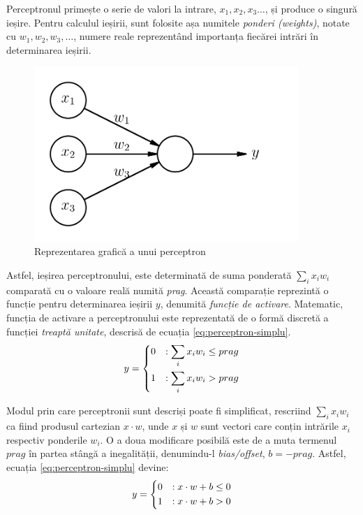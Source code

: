 Perceptronul primește o serie de valori la intrare, $x_1, x_2, x_3\dots$, și produce o singură ieșire. Pentru calculul ieșirii, sunt folosite așa numitele \textit{ponderi (weights)}, notate cu $w_1, w_2, w_3,\dots$, numere reale reprezentând importanța fiecărei intrări în determinarea ieșirii.
\begin{figure}[ht]
\centering
\includegraphics[width=10cm, keepaspectratio]{fig/cap2/perceptron.png}
\caption{Reprezentarea grafică a unui perceptron}
\end{figure}

Astfel, ieșirea perceptronului, este determinată de suma ponderată $\sum_i x_iw_i$ comparată cu o valoare reală numită \textit{prag}. Această comparație reprezintă o funcție pentru determinarea ieșirii $y$, denumită \textit{funcție de activare}. Matematic, funcția de activare a perceptronului este reprezentată de o formă discretă a funcției \textit{treaptă unitate}, descrisă de ecuația \eqref{eq:perceptron-simplu}.
\begin{equation}
y = 
	\begin{dcases}
	0 & : \sum_i x_iw_i \le prag\\
	1 & : \sum_i x_iw_i > prag
	\end{dcases}
\label{eq:perceptron-simplu}
\end{equation}

Modul prin care perceptronii sunt descriși poate fi simplificat, rescriind $\sum\nolimits_i x_iw_i$ ca fiind produsul cartezian $x \cdot w$, unde $x$ și $w$ sunt vectori care conțin intrările $x_i$ respectiv ponderile $w_i$. O a doua modificare posibilă este de a muta termenul $prag$ în partea stângă a inegalității, denumindu-l \textit{bias/offset}, $b=-prag$. Astfel, ecuația \eqref{eq:perceptron-simplu} devine:
\begin{equation}
y = 
	\begin{dcases}
	0 & : x \cdot w + b \le 0\\
	1 & : x \cdot w + b > 0
	\end{dcases}
\label{eq:perceptron}
\end{equation}

